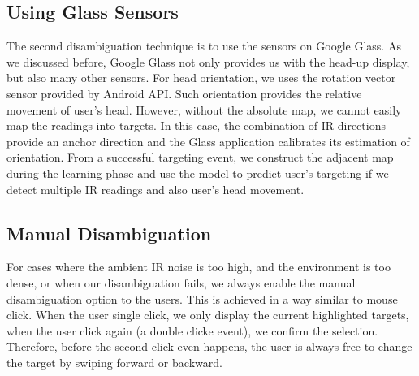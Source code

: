\subsection{Using Glass Sensors}
\label{sec:using-glass-sensors}
The second disambiguation technique is to use the sensors on Google Glass. As we discussed before, Google Glass not only provides us with the head-up display, but also many other sensors. For head orientation, we uses the rotation vector sensor provided by Android API. Such orientation provides the relative movement of user's head. However, without the absolute map, we cannot easily map the readings into targets. In this case, the combination of IR directions provide an anchor direction and the Glass application calibrates its estimation of orientation. From a successful targeting event, we construct the adjacent map during the learning phase and use the model to predict user's targeting if we detect multiple IR readings and also user's head movement. 

\subsection{Manual Disambiguation}
\label{sec:manu-disamb}

For cases where the ambient IR noise is too high, and the environment is too dense, or when our disambiguation fails, we always enable the manual disambiguation option to the users. This is achieved in a way similar to mouse click. When the user single click, we only display the current highlighted targets, when the user click again (a double clicke event), we confirm the selection. Therefore, before the second click even happens, the user is always free to change the target by swiping forward or backward.


